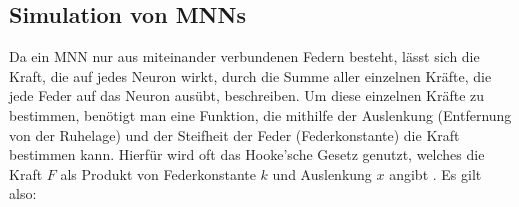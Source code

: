 





\FloatBarrier
\subsection{Simulation von MNNs}\label{sec:MNN-Sim}

Da ein MNN nur aus miteinander verbundenen Federn besteht, lässt sich die Kraft, die auf jedes Neuron wirkt, durch die Summe aller einzelnen Kräfte, die jede Feder auf das Neuron ausübt, beschreiben.
Um diese einzelnen Kräfte zu bestimmen, benötigt man eine Funktion, die mithilfe der Auslenkung (Entfernung von der Ruhelage) und der Steifheit der Feder (Federkonstante) die Kraft bestimmen kann.
Hierfür wird oft das Hooke'sche Gesetz genutzt, welches die Kraft $F$ als Produkt von Federkonstante $k$ und Auslenkung $x$ angibt \cite{wiki:hooke}. Es gilt also:

